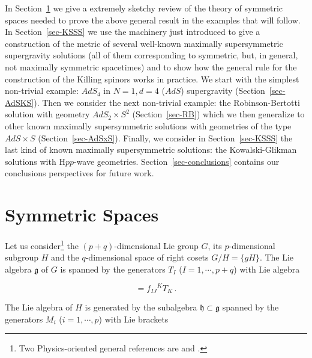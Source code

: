 \documentclass[12pt,a4paper]{article}
\begin{document}
In Section~\ref{sec-symmetric} we give a extremely sketchy review of
the theory of symmetric spaces needed to prove the above general
result in the examples that will follow.  In Section~\ref{sec-KSSS} we
use the machinery just introduced to give a construction of the metric
of several well-known maximally supersymmetric supergravity solutions
(all of them corresponding to symmetric, but, in general, not
maximally symmetric spacetimes) and to show how the general rule for
the construction of the Killing spinors works in practice. We start
with the simplest non-trivial example: $AdS_{4}$ in $N=1,d=4$ ($AdS$)
supergravity (Section~\ref{sec-AdSKS}). Then we consider the next
non-trivial example: the Robinson-Bertotti solution with geometry
$AdS_{2}\times S^{2}$ (Section~\ref{sec-RB}) which we then generalize
to other known maximally supersymmetric solutions with geometries of
the type $AdS\times S$ (Section~\ref{sec-AdSxS}).  Finally, we
consider in Section~\ref{sec-KSSS} the last kind of known maximally
supersymmetric solutions: the Kowalski-Glikman solutions with
H$pp$-wave geometries.  Section~\ref{sec-conclusions} contains our
conclusions perspectives for future work.



\section{Symmetric Spaces}
\label{sec-symmetric}

Let us consider\footnote{Two Physics-oriented general references are
  \cite{Castellani:et} and \cite{Coquereaux:ne}.} the
$(p+q)$-dimensional Lie group $G$, its $p$-dimensional subgroup $H$
and the $q$-dimensional space of right cosets $G/H=\{gH\}$. The Lie
algebra $\mathfrak{g}$ of $G$ is spanned by the generators $T_{I}$
($I=1,\cdots,p+q$) with Lie algebra

\begin{equation}
[T_{I},T_{J}] = f_{IJ}{}^{K}T_{K}\, .  
\end{equation}

\noindent
The Lie algebra of $H$ is generated by the subalgebra
$\mathfrak{h}\subset \mathfrak{g}$ spanned by the generators $M_{i}$
($i=1,\cdots,p$) with Lie brackets
\end{document}
